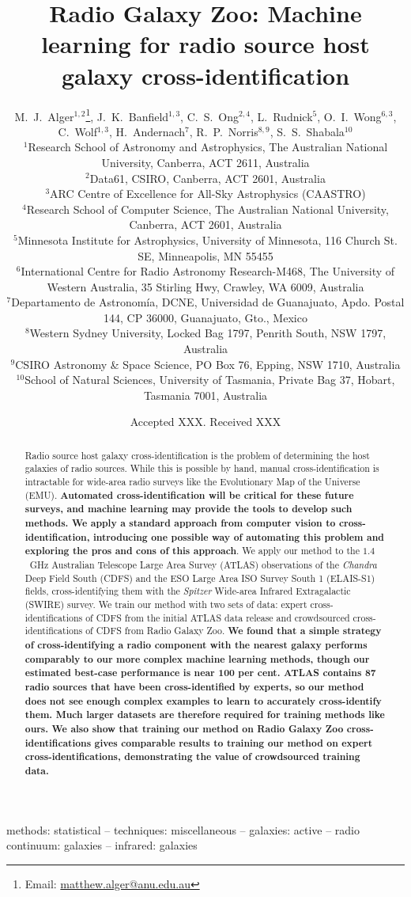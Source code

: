 \documentclass[fleqn,usenatbib,usedcolumn]{mnras}
\title[Machine learning for radio cross-identification]{Radio Galaxy Zoo: Machine learning for radio source host galaxy cross-identification}
\author[Alger et al.]{M.~J.~Alger$^{1, 2}$\thanks{Email: \href{mailto:matthew.alger@anu.edu.au}{matthew.alger@anu.edu.au}},
  J.~K.~Banfield$^{1, 3}$,
  C.~S.~Ong$^{2, 4}$,
  L.~Rudnick$^{5}$,
  O.~I.~Wong$^{6, 3}$,
  C.~Wolf$^{1, 3}$,
  \newauthor
  H.~Andernach$^{7}$,
  R.~P.~Norris$^{8, 9}$,
  S.~S.~Shabala$^{10}$
\\
$^{1}$Research School of Astronomy and Astrophysics, The Australian National University, Canberra, ACT 2611, Australia\\
$^{2}$Data61, CSIRO, Canberra, ACT 2601, Australia\\
$^{3}$ARC Centre of Excellence for All-Sky Astrophysics (CAASTRO)\\
$^{4}$Research School of Computer Science, The Australian National University, Canberra, ACT 2601, Australia\\
$^{5}$Minnesota Institute for Astrophysics, University of Minnesota, 116 Church St. SE, Minneapolis, MN 55455\\
$^{6}$International Centre for Radio Astronomy Research-M468, The University of Western Australia, 35 Stirling Hwy, Crawley, WA 6009, Australia\\
$^{7}$Departamento de Astronom\'ia, DCNE, Universidad de Guanajuato, Apdo. Postal 144, CP 36000, Guanajuato, Gto., Mexico\\
$^{8}$Western Sydney University, Locked Bag 1797, Penrith South, NSW 1797, Australia\\
$^{9}$CSIRO Astronomy \& Space Science, PO Box 76, Epping, NSW 1710, Australia\\
$^{10}$School of Natural Sciences, University of Tasmania, Private Bag 37, Hobart, Tasmania 7001, Australia
}
\date{Accepted XXX. Received XXX}
\newcommand{\edited}[1]{{\bf {#1}}}
\begin{document}
\label{firstpage}
\pagerange{\pageref{firstpage}--\pageref{lastpage}}
\maketitle

\begin{abstract}
  Radio source host galaxy cross-identification is the problem of determining
  the host galaxies of radio sources. While this is possible by hand, manual
  cross-identification is intractable for wide-area radio surveys like the
  Evolutionary Map of the Universe (EMU). \edited{Automated
  cross-identification will be critical for these future surveys, and machine
  learning may provide the tools to develop such methods. We apply a standard
  approach from computer vision to cross-identification, introducing one
  possible way of automating this problem and exploring the pros and cons of
  this approach}. We apply our method to the $1.4$~GHz Australian Telescope
  Large Area Survey (ATLAS) observations of the \emph{Chandra} Deep Field
  South (CDFS) and the ESO Large Area ISO Survey South 1 (ELAIS-S1) fields,
  cross-identifying them with the \emph{Spitzer} Wide-area Infrared
  Extragalactic (SWIRE) survey. We train our method with two sets of
  data: expert cross-identifications of CDFS from the initial ATLAS data
  release and crowdsourced cross-identifications of CDFS from Radio Galaxy
  Zoo. \edited{We found that a simple strategy of cross-identifying a radio component
  with the nearest galaxy performs comparably to our more complex machine learning methods, though our estimated best-case performance is near 100 per cent.
  ATLAS contains 87 radio sources that have been cross-identified by experts,
  so our method does not see enough
  complex examples to learn to accurately cross-identify them. Much larger
  datasets are therefore required for training methods like ours. We also show
  that training our method on Radio Galaxy Zoo cross-identifications gives
  comparable results to training our method on expert cross-identifications,
  demonstrating the value of crowdsourced training data.}
\end{abstract}

\begin{keywords}
methods: statistical -- techniques: miscellaneous -- galaxies: active -- radio continuum: galaxies -- infrared: galaxies\\
\end{keywords}
\end{document}
